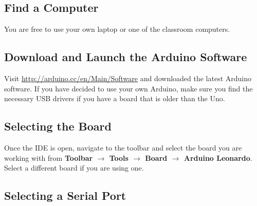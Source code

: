 \documentclass[11pt,a4paper]{article}
\begin{document}
\subsection{Find a Computer} %
\label{sub:find_a_computer}
You are free to use your own laptop or one of the classroom computers.


\subsection{Download and Launch the Arduino Software} %
\label{sub:download_and_launch_the_arduino_software}
Visit \url{http://arduino.cc/en/Main/Software} and downloaded the latest Arduino software\cite{arduino-dl}.  If you have decided to use your own Arduino, make sure you find the necessary USB drivers if you have a board that is older than the Uno.


\subsection{Selecting the Board} %
\label{sub:selecting_the_board}
Once the IDE is open, navigate to the toolbar and select the board you are working with from \textbf{Toolbar $\rightarrow$ Tools $\rightarrow$ Board $\rightarrow$ Arduino Leonardo}.  Select a different board if you are using one.


\subsection{Selecting a Serial Port} %
\end{document}
